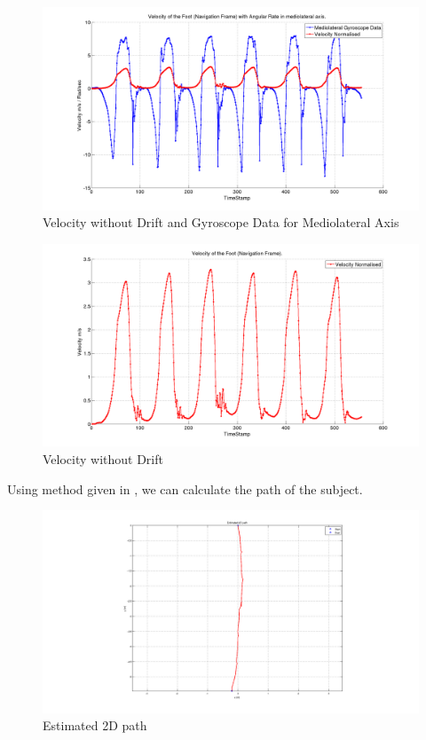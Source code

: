 \documentclass[12pt]{article}
\begin{document}
\begin{figure}[!htb]
\centering
\includegraphics[scale=.3]{velocityGyro.png}
\caption{Velocity without Drift and Gyroscope Data for Mediolateral Axis}
\label{velocityGyro}
\end{figure}
\FloatBarrier

\begin{figure}[!htb]
\centering
\includegraphics[scale=.3]{velocity.png}
\caption{Velocity without Drift}
\label{velocity}
\end{figure}

\FloatBarrier

Using method given in \cite{6127851}, we can calculate the path of the subject.
\begin{figure}[!htb]
\centering
\includegraphics[scale=.35]{position.png}
\caption{Estimated 2D path}
\label{position}
\end{figure}

\FloatBarrier

{}

\end{document}
